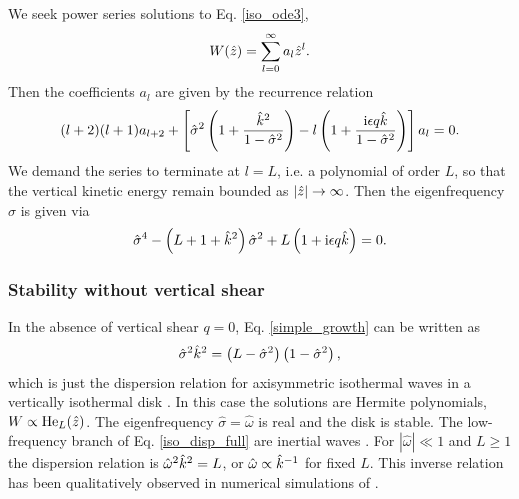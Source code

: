 
We seek power series solutions to Eq. \ref{iso_ode3}, 
\begin{align}
  W(\hat{z}) = \sum_{l=0}^\infty a_l\hat{z}^l. 
\end{align}
Then the coefficients $a_l$ are given by the recurrence relation
\begin{align}
  (l+2)(l+1)a_{l+2} +
  \left[\hat{\sigma}^2\left(1+\frac{\hat{k}^2}{1-\hat{\sigma}^2}\right)
    - l\left(1+\frac{\mathrm{i} \epsilon q
        \hat{k}}{1-\hat{\sigma}^2}\right)\right] a_l = 0. 
\end{align}
We demand the series to terminate  at $l=L$, i.e. a polynomial of
order $L$, so that the vertical kinetic energy remain bounded as 
$|\hat{z}|\to\infty$.  Then the eigenfrequency $\hat{\sigma}$ is given via 
\begin{align}
\hat{\sigma}^4 - \left(L+1+\hat{k}^2\right)\hat{\sigma}^2 + L\left(1 +
  \mathrm{i}\epsilon q \hat{k}\right) = 0. \label{simple_growth}
\end{align}

\subsubsection{Stability without vertical shear}\label{stable_novshear}
In the absence of vertical shear $q=0$, Eq. \ref{simple_growth} can be
written as \begin{align}
  \hat{\sigma}^2\hat{k}^2 =
  \left(L-\hat{\sigma}^2\right)\left(1-\hat{\sigma}^2\right), \label{iso_disp_full}
\end{align}
which is just the dispersion relation for axisymmetric isothermal waves in a
vertically isothermal disk
\citep[e.g.][]{okazaki87,takeuchi98,tanaka02,zhang06,ogilvie13,barker14}. In 
this case the solutions are Hermite polynomials, $W\propto
\operatorname{He}_L(\hat{z})$.  The eigenfrequency $\hat{\sigma} = \hat{\omega}$ is real and the disk
is stable. The low-frequency branch of Eq. \ref{iso_disp_full} are 
inertial waves \citep{balbus03}. For 
$|\hat{\omega}|\ll 1$ and $L\geq 1$ the dispersion relation is
$\hat{\omega}^2\hat{k}^2 = L$, or $\hat{\omega}\propto \hat{k}^{-1}$ for
fixed $L$.  This inverse relation has been qualitatively
observed in numerical simulations of \cite{stoll14}. 

